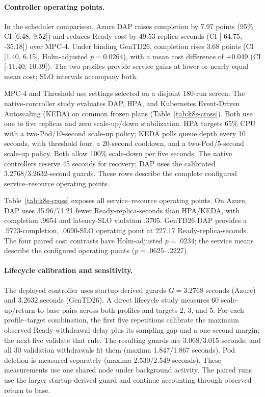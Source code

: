 \documentclass[acmsmall,screen,review,anonymous]{acmart}
\begin{document}
\paragraph{Controller operating points.}
In the scheduler comparison, Azure DAP raises completion by 7.97 points
(95\% CI [6.48, 9.52]) and reduces Ready cost by 49.53 replica-seconds
(CI [-64.75, -35.18]) over MPC-4. Under binding GenTD26, completion rises
3.68 points (CI [1.40, 6.15], Holm-adjusted \(p=0.0264\)), with a mean cost
difference of +0.049 (CI [-11.40, 10.39]). The two profiles provide service
gains at lower or nearly equal mean cost; SLO intervals accompany both.

MPC-4 and Threshold use settings selected on a disjoint 180-run screen.
The native-controller study evaluates DAP, HPA, and Kubernetes Event-Driven
Autoscaling (KEDA) on common frozen plans
(Table~\ref{tab:k8s-cross}).
Both use one to five replicas and zero scale-up/down stabilization. HPA
targets 65\% CPU with a two-Pod/10-second scale-up policy; KEDA polls
queue depth every 10 seconds, with threshold four, a 20-second cooldown,
and a two-Pod/5-second scale-up policy. Both allow 100\% scale-down per
five seconds. The native controllers reserve 45 seconds for recovery; DAP uses the calibrated
3.2768/3.2632-second guards. These rows describe the complete configured
service--resource operating points.

Table~\ref{tab:k8s-cross} exposes all service--resource operating points.
On Azure, DAP uses 35.96/71.21 fewer Ready-replica-seconds than HPA/KEDA,
with completion .9654 and latency-SLO violation .3705. GenTD26 DAP provides
a .9723-completion, .0690-SLO operating point at 227.17 Ready-replica-seconds.
The four paired cost contrasts have Holm-adjusted $p=.0234$; the service
means describe the configured operating points ($p=.0625$--$.2227$).



\paragraph{Lifecycle calibration and sensitivity.}
The deployed controller uses startup-derived guards \(G=3.2768\) seconds
(Azure) and \(3.2632\) seconds (GenTD26). A direct lifecycle study measures 60
scale-up/return-to-base pairs across both profiles and targets 2, 3, and 5.
For each profile--target combination, the first five repetitions calibrate the maximum observed
Ready-withdrawal delay plus its sampling gap and a one-second margin; the next
five validate that rule. The resulting guards are 3.068/3.015 seconds, and all
30 validation withdrawals fit them (maxima 1.847/1.867 seconds). Pod deletion
is measured separately (maxima 2.530/2.549 seconds). These measurements use one
shared node under background activity. The paired
runs use the larger startup-derived guard
and continue accounting through observed return to base.
\end{document}
